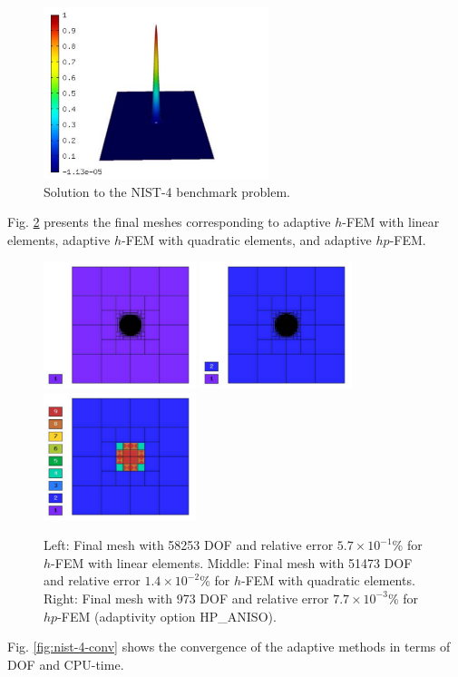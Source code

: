 \documentclass[12pt]{elsarticle}
\begin{document}
\begin{figure}[H]
\centering
\includegraphics[height=5cm]{mafig23.pdf}
\caption{Solution to the NIST-4 benchmark problem.}
\vspace{-3mm}
\label{fig:sln-nist04}
\end{figure}

Fig. \ref{fig:nist-4-hp-aniso} presents the final meshes corresponding to adaptive $h$-FEM with
linear elements, adaptive $h$-FEM with quadratic elements, and adaptive $hp$-FEM.

\begin{figure}[H]
\centering
\includegraphics[height=3.7cm]{mafig24.pdf}
\includegraphics[height=3.7cm]{mafig25.pdf}
\includegraphics[height=3.7cm]{mafig26.pdf}
\caption{
Left: Final mesh with 58253 DOF and relative error $5.7\times10^{-1}$\% for $h$-FEM with linear elements.
Middle: Final mesh with 51473 DOF and relative error $1.4\times10^{-2}$\% for $h$-FEM with quadratic elements.
Right: Final mesh with 973 DOF and relative error $7.7\times10^{-3}$\% for $hp$-FEM (adaptivity option HP\_ANISO).}
\label{fig:nist-4-hp-aniso}
\end{figure}
Fig. \ref{fig:nist-4-conv} shows the convergence of the adaptive methods in terms of DOF and CPU-time.
\end{document}
